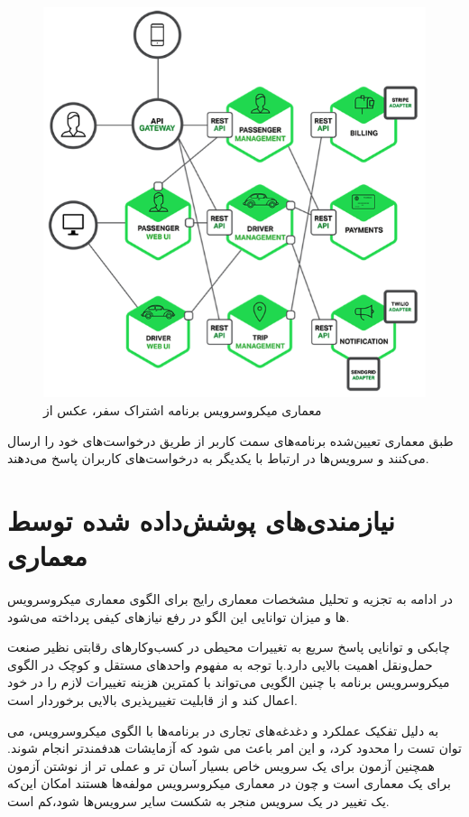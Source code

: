 \begin{figure}[htb]
\centering
\includegraphics[scale=0.7]{trip.png}
\caption{ معماری میکروسرویس برنامه اشتراک سفر، عکس از \cite{micro_carpooling}}
\label{fig:trip}
\end{figure}

طبق معماری تعیین‌شده برنامه‌های سمت کاربر از طریق  درخواست‌های خود را ارسال می‌کنند و سرویس‌ها در ارتباط با یکدیگر به درخواست‌های کاربران پاسخ می‌دهند.


\section{نیازمندی‌های پوشش‌داده شده توسط معماری}
در ادامه به تجزیه و تحلیل مشخصات معماری رایج برای الگوی معماری میکرو‌سرویس ها و میزان توانایی این الگو در رفع نیاز‌های کیفی پرداخته می‌شود.

چابکی و توانایی پاسخ سریع به تغییرات محیطی در کسب‌و‌کار‌های رقابتی نظیر صنعت حمل‌و‌نقل اهمیت بالایی دارد.با توجه به مفهوم واحدهای مستقل و کوچک در الگوی میکرو‌سرویس برنامه با چنین الگویی می‌تواند با کمترین هزینه تغییرات لازم را در خود اعمال کند و از قابلیت تغییر‌پذیری بالایی برخوردار است.

به دلیل تفکیک عملکرد و دغدغه‌های تجاری در برنامه‌ها با الگوی میکرو‌سرویس، می توان تست را محدود کرد، و این امر باعث می شود که آزمایشات هدفمندتر انجام شوند. همچنین آزمون برای یک سرویس خاص بسیار آسان تر و عملی تر از نوشتن آزمون برای یک معماری  است و چون در معماری میکروسرویس مولفه‌ها  هستند امکان این‌که یک تغییر در یک سرویس منجر به شکست سایر سرویس‌ها شود،کم است.

